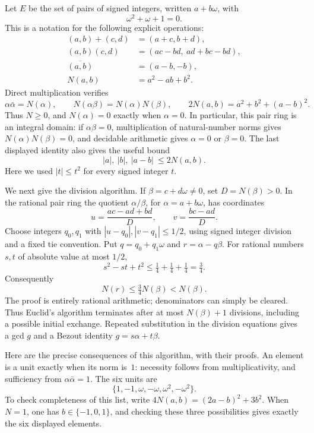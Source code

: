 Let $E$ be the set of pairs of signed integers, written $a+b\omega$, with
\[
 \omega^2+\omega+1=0.
\]
This is a notation for the following explicit operations:
\begin{align*}
 (a,b)+(c,d)&=(a+c,b+d),\\
 (a,b)(c,d)&=(ac-bd,\ ad+bc-bd),\\
 \overline{(a,b)}&=(a-b,-b),\\
 N(a,b)&=a^2-ab+b^2.
\end{align*}
Direct multiplication verifies
\[
 \alpha\bar\alpha=N(\alpha),\qquad
 N(\alpha\beta)=N(\alpha)N(\beta),\qquad
 2N(a,b)=a^2+b^2+(a-b)^2.
\]
Thus $N\ge0$, and $N(\alpha)=0$ exactly when $\alpha=0$.
In particular, this pair ring is an integral domain: if
$\alpha\beta=0$, multiplication of natural-number norms gives
$N(\alpha)N(\beta)=0$, and decidable arithmetic gives $\alpha=0$ or
$\beta=0$.  The last displayed identity also gives the useful bound
\begin{equation}
 |a|,\ |b|,\ |a-b|\ \le 2N(a,b).
 \label{eq:cubic-coordinate-bound}
\end{equation}
Here we used $|t|\le t^2$ for every signed integer $t$.

We next give the division algorithm.  If $\beta=c+d\omega\ne0$, set
$D=N(\beta)>0$.  In the rational pair ring the quotient $\alpha/\beta$,
for $\alpha=a+b\omega$, has coordinates
\[
 u=\frac{ac-ad+bd}{D},\qquad v=\frac{bc-ad}{D}.
\]
Choose integers $q_0,q_1$ with $|u-q_0|,|v-q_1|\le1/2$, using signed
integer division and a fixed tie convention.  Put
$q=q_0+q_1\omega$ and $r=\alpha-q\beta$.  For rational numbers
$s,t$ of absolute value at most $1/2$,
\[
 s^2-st+t^2\le\tfrac14+\tfrac14+\tfrac14=\tfrac34.
\]
Consequently
\[
 N(r)\le\tfrac34N(\beta)<N(\beta).
\]
The proof is entirely rational arithmetic; denominators can simply be
cleared.  Thus Euclid's algorithm terminates after at most
$N(\beta)+1$ divisions, including a possible initial exchange.  Repeated
substitution in the division equations gives a gcd $g$ and a Bezout
identity $g=s\alpha+t\beta$.

Here are the precise consequences of this algorithm, with their proofs.
An element is a unit exactly when its norm is~$1$: necessity follows
from multiplicativity, and sufficiency from $\alpha\bar\alpha=1$.
The six units are
\[
 \{1,-1,\omega,-\omega,\omega^2,-\omega^2\}.
\]
To check completeness of this list, write
$4N(a,b)=(2a-b)^2+3b^2$.  When $N=1$, one has
$b\in\{-1,0,1\}$, and checking these three possibilities gives exactly
the six displayed elements.

